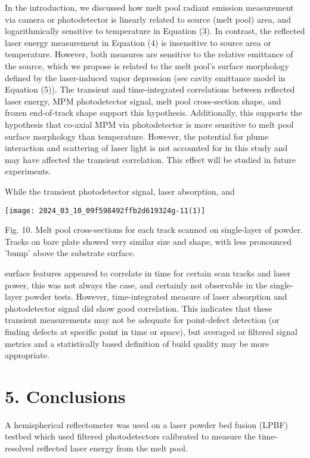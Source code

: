 \documentclass[10pt]{article}
\begin{document}
In the introduction, we discussed how melt pool radiant emission measurement via camera or photodetector is linearly related to source (melt pool) area, and logarithmically sensitive to temperature in Equation (3). In contrast, the reflected laser energy measurement in Equation (4) is insensitive to source area or temperature. However, both measures are sensitive to the relative emittance of the source, which we propose is related to the melt pool's surface morphology defined by the laser-induced vapor depression (see cavity emittance model in Equation (5)). The transient and time-integrated correlations between reflected laser energy, MPM photodetector signal, melt pool cross-section shape, and frozen end-of-track shape support this hypothesis. Additionally, this supports the hypothesis that co-axial MPM via photodetector is more sensitive to melt pool surface morphology than temperature. However, the potential for plume interaction and scattering of laser light is not accounted for in this study and may have affected the transient correlation. This effect will be studied in future experiments.

While the transient photodetector signal, laser absorption, and

\begin{center}
\texttt{[image: 2024\_03\_10\_09f598492ffb2d619324g-11(1)]}
\end{center}

Fig. 10. Melt pool cross-sections for each track scanned on single-layer of powder. Tracks on bare plate showed very similar size and shape, with less pronounced 'bump' above the substrate surface.

surface features appeared to correlate in time for certain scan tracks and laser power, this was not always the case, and certainly not observable in the single-layer powder tests. However, time-integrated measure of laser absorption and photodetector signal did show good correlation. This indicates that these transient measurements may not be adequate for point-defect detection (or finding defects at specific point in time or space), but averaged or filtered signal metrics and a statistically based definition of build quality may be more appropriate.

\section*{5. Conclusions}
A hemispherical reflectometer was used on a laser powder bed fusion (LPBF) testbed which used filtered photodetectors calibrated to measure the time-resolved reflected laser energy from the melt pool.
\end{document}
